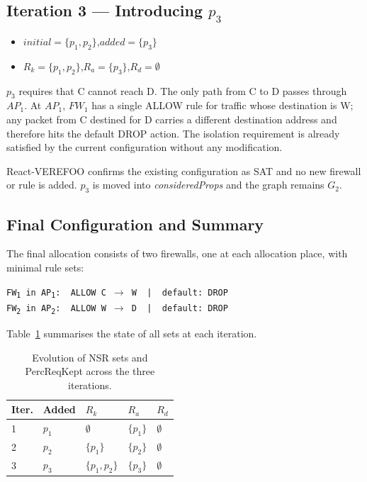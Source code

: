 \subsection{Iteration 3 — Introducing \texorpdfstring{$p_3$}{p3}}

\begin{itemize}
  \item $\mathit{initial} = \{p_1, p_2\}$,\quad $\mathit{added} = \{p_3\}$
  \item $R_k = \{p_1, p_2\}$,\quad $R_a = \{p_3\}$,\quad $R_d = \emptyset$
\end{itemize}

$p_3$ requires that C cannot reach D. The only path from C to D passes through $\mathit{AP}_1$. At $\mathit{AP}_1$, $\mathit{FW}_1$ has a single ALLOW rule for traffic whose destination is W; any packet from C destined for D carries a different destination address and therefore hits the default DROP action. The isolation requirement is already satisfied by the current configuration without any modification.

React-VEREFOO confirms the existing configuration as SAT and no new firewall or rule is added. $p_3$ is moved into \textit{consideredProps} and the graph remains $G_2$.

\subsection{Final Configuration and Summary}

The final allocation consists of two firewalls, one at each allocation place, with minimal rule sets:

\begin{center}
\texttt{FW\textsubscript{1} in AP\textsubscript{1}:\ \ ALLOW C\,$\to$\,W\ \ |\ \ default: DROP} \\[4pt]
\texttt{FW\textsubscript{2} in AP\textsubscript{2}:\ \ ALLOW W\,$\to$\,D\ \ |\ \ default: DROP}
\end{center}

Table~\ref{tab:worked-example} summarises the state of all sets at each iteration.

\begin{table}[H]
\centering
\caption{Evolution of NSR sets and PercReqKept across the three iterations.}
\label{tab:worked-example}
\begin{tabularx}{\textwidth}{lXXXX}
\hline
\textbf{Iter.} & \textbf{Added} & $R_k$ & $R_a$ & $R_d$ \\
\hline
1 & $p_1$ & $\emptyset$ & $\{p_1\}$ & $\emptyset$ \\
2 & $p_2$ & $\{p_1\}$ & $\{p_2\}$ & $\emptyset$ \\
3 & $p_3$ & $\{p_1, p_2\}$ & $\{p_3\}$ & $\emptyset$ \\
\hline
\end{tabularx}
\end{table}

